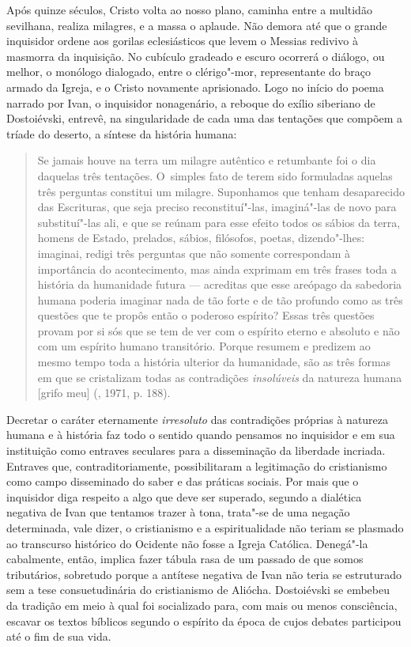 Após quinze séculos, Cristo volta ao nosso plano, caminha entre a
multidão sevilhana, realiza milagres, e a massa o aplaude. Não demora
até que o grande inquisidor ordene aos gorilas eclesiásticos que levem o
Messias redivivo à masmorra da inquisição. No cubículo gradeado e escuro
ocorrerá o diálogo, ou melhor, o monólogo dialogado, entre o
clérigo"-mor, representante do braço armado da Igreja, e o Cristo
novamente aprisionado. Logo no início do poema narrado por Ivan, o
inquisidor nonagenário, a reboque do exílio siberiano de Dostoiévski,
entrevê, na singularidade de cada uma das tentações que compõem a tríade
do deserto, a síntese da história humana:

\begin{quote}
Se jamais houve na terra um milagre autêntico e retumbante foi o dia
daquelas três tentações. O~simples fato de terem sido formuladas aquelas
três perguntas constitui um milagre. Suponhamos que tenham desaparecido
das Escrituras, que seja preciso reconstituí"-las, imaginá"-las de novo
para substituí"-las ali, e que se reúnam para esse efeito todos os sábios
da terra, homens de Estado, prelados, sábios, filósofos, poetas,
dizendo"-lhes: imaginai, redigi três perguntas que não somente
correspondam à importância do acontecimento, mas ainda exprimam em três
frases toda a história da humanidade futura --- acreditas que esse
areópago da sabedoria humana poderia imaginar nada de tão forte e de tão
profundo como as três questões que te propôs então o poderoso espírito?
Essas três questões provam por si sós que se tem de ver com o espírito
eterno e absoluto e não com um espírito humano transitório. Porque
resumem e predizem ao mesmo tempo toda a história ulterior da
humanidade, são as três formas em que se cristalizam todas as
contradições \emph{insolúveis} da natureza humana {[}grifo meu{]}
(, 1971, p. 188).
\end{quote}

Decretar o caráter eternamente \emph{irresoluto} das contradições
próprias à natureza humana e à história faz todo o sentido quando
pensamos no inquisidor e em sua instituição como entraves seculares para
a disseminação da liberdade incriada. Entraves que, contraditoriamente,
possibilitaram a legitimação do cristianismo como campo disseminado do
saber e das práticas sociais. Por mais que o inquisidor diga respeito a
algo que deve ser superado, segundo a dialética negativa de Ivan que
tentamos trazer à tona, trata"-se de uma negação determinada, vale dizer,
o cristianismo e a espiritualidade não teriam se plasmado ao transcurso
histórico do Ocidente não fosse a Igreja Católica. Denegá"-la cabalmente,
então, implica fazer tábula rasa de um passado de que somos tributários,
sobretudo porque a antítese negativa de Ivan não teria se estruturado
sem a tese consuetudinária do cristianismo de Aliócha. Dostoiévski se
embebeu da tradição em meio à qual foi socializado para, com mais ou
menos consciência, escavar os textos bíblicos segundo o espírito da
época de cujos debates participou até o fim de sua vida.

